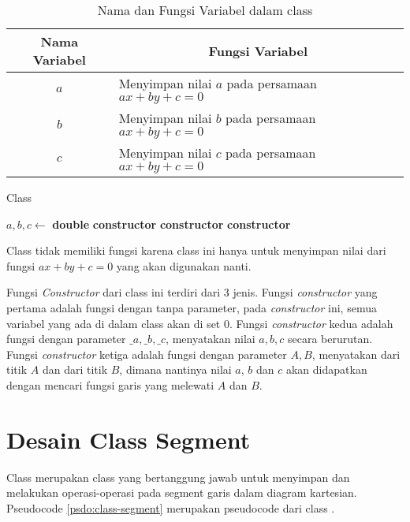 \begin{table}[]
	\Centering
	\begin{tabular}{|c|p{7cm}|}
	\hline
	Nama Variabel & \multicolumn{1}{c|}{Fungsi Variabel}                               \\ \hline
$a$           & Menyimpan nilai $a$ pada persamaan $ax + by + c =0$ \\ \hline
$b$           & Menyimpan nilai $b$ pada persamaan $ax + by + c =0$          \\ \hline
$c$           & Menyimpan nilai $c$ pada persamaan $ax + by + c =0$          \\ \hline
	\end{tabular}
	\caption{Nama dan Fungsi Variabel dalam class }
	\label{tab:var-line}
\end{table}
\begin{algorithm}
	\caption{Class }
	\label{psdo:class-line}
	\begin{algorithmic}[1]
        \State $ a, b, c \leftarrow $ \textbf{double}
		\State \textbf{constructor} 
        \State \textbf{constructor} 
        \State \textbf{constructor} 
	\end{algorithmic}
\end{algorithm}

Class  tidak memiliki fungsi karena class ini hanya untuk menyimpan nilai dari fungsi $ax+by+c=0$ yang akan digunakan nanti.

Fungsi \textit{Constructor} dari class ini terdiri dari 3 jenis. Fungsi \textit{constructor} yang pertama adalah fungsi dengan tanpa parameter, pada \textit{constructor} ini, semua variabel yang ada di dalam class  akan di set $0$. Fungsi \textit{constructor} kedua adalah fungsi dengan parameter $\_a, \_b, \_c$, menyatakan nilai $a, b, c$ secara berurutan. Fungsi \textit{constructor} ketiga adalah fungsi dengan parameter $A, B$, menyatakan  dari titik $A$ dan  dari titik $B$, dimana nantinya nilai $a$, $b$ dan $c$ akan didapatkan dengan mencari fungsi garis yang melewati  $A$ dan  $B$.

\section{Desain Class Segment}
\label{sec:segment}
Class  merupakan class yang bertanggung jawab untuk menyimpan dan melakukan operasi-operasi pada segment garis dalam diagram kartesian. Pseudocode \ref{psdo:class-segment} merupakan pseudocode dari class . 

